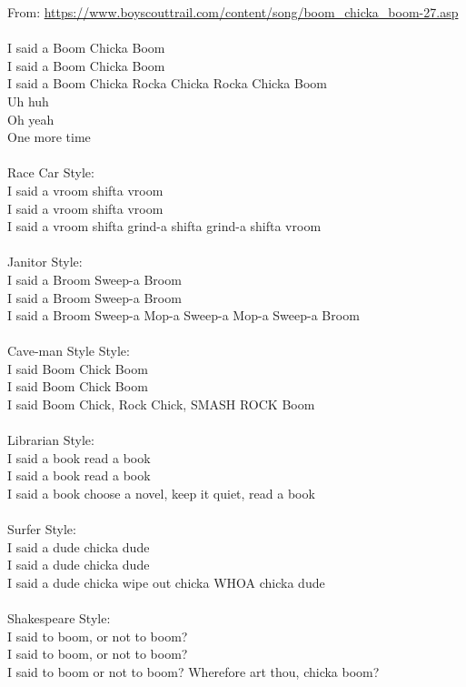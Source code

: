 
From: \url{https://www.boyscouttrail.com/content/song/boom_chicka_boom-27.asp}\\
\\
I said a Boom Chicka Boom \\
I said a Boom Chicka Boom \\
I said a Boom Chicka Rocka Chicka Rocka Chicka Boom \\
Uh huh \\
Oh yeah \\
One more time \\
\\
Race Car Style:\\
I said a vroom shifta vroom\\
I said a vroom shifta vroom\\
I said a vroom shifta grind-a shifta grind-a shifta vroom\\
\\
Janitor Style:\\
I said a Broom Sweep-a Broom\\
I said a Broom Sweep-a Broom\\
I said a Broom Sweep-a Mop-a Sweep-a Mop-a Sweep-a Broom\\
\\
Cave-man Style Style:\\
I said Boom Chick Boom \\
I said Boom Chick Boom \\
I said Boom Chick, Rock Chick, SMASH ROCK Boom \\
\\
Librarian Style:\\
I said a book read a book\\
I said a book read a book\\
I said a book choose a novel, keep it quiet, read a book\\
\\
Surfer Style:\\
I said a dude chicka dude\\
I said a dude chicka dude\\
I said a dude chicka wipe out chicka WHOA chicka dude\\
\\
Shakespeare Style:\\
I said to boom, or not to boom?\\
I said to boom, or not to boom?\\
I said to boom or not to boom? Wherefore art thou, chicka boom?\\
